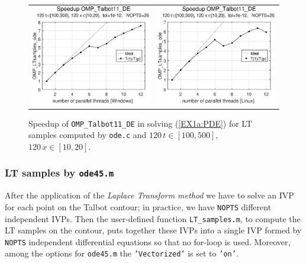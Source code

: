 \documentclass[a4paper,10pt]{report}%
\begin{document}
\begin{figure}[htb]
\centering
\begin{tabular}{cc}
\includegraphics[height=0.2\textwidth]{./FIGS/EX1a/EX1a_ode_speedup_11_Windows.eps} &
\includegraphics[height=0.2\textwidth]{./FIGS/EX1a/EX1a_ode_speedup_11_Linux.eps}
\end{tabular}
\caption{\small Speedup of {\tt OMP\_Talbot11\_DE} in solving (\ref{EX1a:PDE}) for LT samples computed
by {\tt ode.c} and $120\,t\in[100,500]$, $120\,x\in[10,20]$.}
\label{PAR_EX1a_speedup_ode}
\end{figure}


\newpage
\subsubsection{LT samples by {\tt ode45.m}}
After the application of the {\em Laplace Transform method} we have to solve an IVP for each point on the Talbot
contour; in practice, we have {\tt NOPTS} different independent IVPs. Then the user-defined function
{\tt LT\_samples.m}, to compute the LT samples on the contour, puts together these IVPs into a single IVP formed by
{\tt NOPTS} independent differential equations so that no for-loop is used. Moreover, among the options for
{\tt ode45.m} the {\tt 'Vectorized'} is set to {\tt 'on'}.
\end{document}
